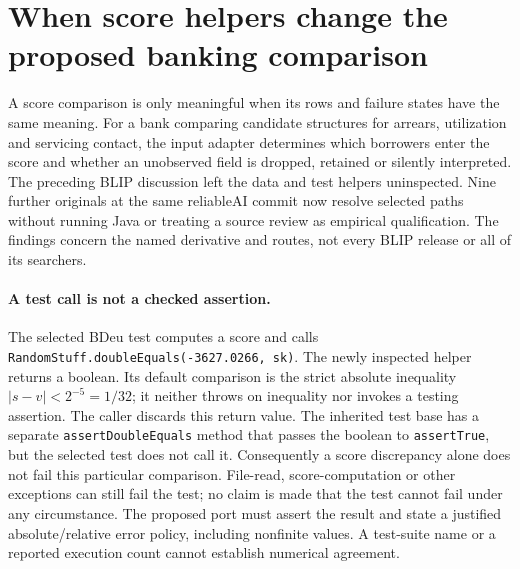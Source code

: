 
\section{When score helpers change the proposed banking comparison}
\label{sec:exec28-blip-helpers}

A score comparison is only meaningful when its rows and failure states have the same meaning.
For a bank comparing candidate structures for arrears, utilization and servicing contact,
the input adapter determines which borrowers enter the score and whether an unobserved
field is dropped, retained or silently interpreted. The preceding BLIP discussion left
the data and test helpers uninspected. Nine further originals at the same reliableAI
commit now resolve selected paths without running Java or treating a source review as
empirical qualification. The findings concern the named derivative and routes, not every
BLIP release or all of its searchers.~\citep{exec28_blip_helpers}

\paragraph{A test call is not a checked assertion.}
The selected BDeu test computes a score and calls
\texttt{RandomStuff.doubleEquals(-3627.0266, sk)}. The newly inspected helper returns a
boolean. Its default comparison is the strict absolute inequality
\( |s-v|<2^{-5}=1/32 \); it neither throws on inequality nor invokes a testing assertion.
The caller discards this return value. The inherited test base has a separate
\texttt{assertDoubleEquals} method that passes the boolean to \texttt{assertTrue}, but
the selected test does not call it. Consequently a score discrepancy alone does not
fail this particular comparison. File-read, score-computation or other exceptions can
still fail the test; no claim is made that the test cannot fail under any circumstance.
The proposed port must assert the result and state a justified absolute/relative error
policy, including nonfinite values. A test-suite name or a reported execution count
cannot establish numerical agreement.~\citep{exec28_blip_helpers}

